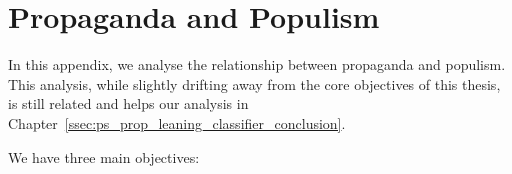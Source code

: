 \chapter{Propaganda and Populism}
\label{app:prop_and_populism}

In this appendix, we analyse the relationship between propaganda and populism.
This analysis, while slightly drifting away from the core objectives of this thesis, is still related and helps our analysis in Chapter~\ref{ssec:ps_prop_leaning_classifier_conclusion}.



We have three main objectives:

